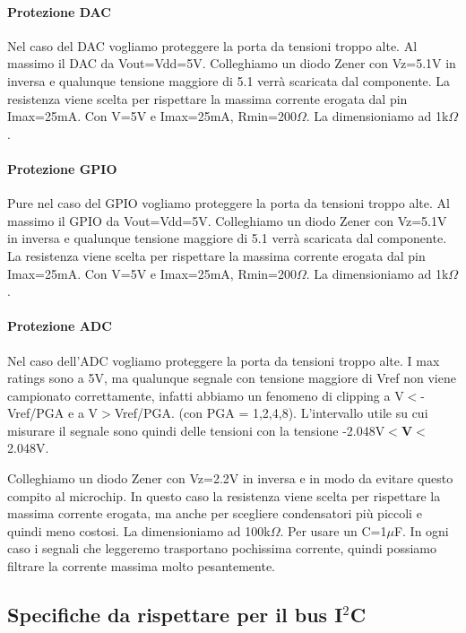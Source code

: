 \documentclass[10pt]{article}
\begin{document}
			\paragraph{Protezione DAC}
				Nel caso del DAC vogliamo proteggere la porta da tensioni troppo alte. Al massimo il DAC da Vout=Vdd=5V. Colleghiamo un diodo Zener con Vz=5.1V in inversa e qualunque tensione maggiore di 5.1 verrà scaricata dal componente.
				La resistenza viene scelta per rispettare la massima corrente erogata dal pin Imax=25mA. Con V=5V e Imax=25mA, Rmin=200\(\Omega\). La dimensioniamo ad 1k\(\Omega\).
			\paragraph{Protezione GPIO}
				Pure nel caso del GPIO vogliamo proteggere la porta da tensioni troppo alte. Al massimo il GPIO da Vout=Vdd=5V. Colleghiamo un diodo Zener con Vz=5.1V in inversa e qualunque tensione maggiore di 5.1 verrà scaricata dal componente.
				La resistenza viene scelta per rispettare la massima corrente erogata dal pin Imax=25mA. Con V=5V e Imax=25mA, Rmin=200\(\Omega\). La dimensioniamo ad 1k\(\Omega\).
			\paragraph{Protezione ADC}
				Nel caso dell'ADC vogliamo proteggere la porta da tensioni troppo alte. I max ratings sono a 5V, ma qualunque segnale con tensione maggiore di Vref non viene campionato correttamente,
				infatti abbiamo un fenomeno di clipping a V\(<\)-Vref/PGA e a V\(>\)Vref/PGA. (con PGA = 1,2,4,8).
				L'intervallo utile su cui misurare il segnale sono quindi delle tensioni con la tensione -2.048V\(<\)\textbf{V}\(<\)2.048V.

				Colleghiamo un diodo Zener con Vz=2.2V in inversa e in modo da evitare questo compito al microchip.
				In questo caso la resistenza viene scelta per rispettare la massima corrente erogata, ma anche per scegliere condensatori più piccoli e quindi meno costosi.
				La dimensioniamo ad 100k\(\Omega\). Per usare un C=1\(\mu\)F. In ogni caso i segnali che leggeremo trasportano pochissima corrente, quindi possiamo filtrare la corrente massima molto pesantemente.


	\subsection{Specifiche da rispettare per il bus I\(^2\)C}
\end{document}
